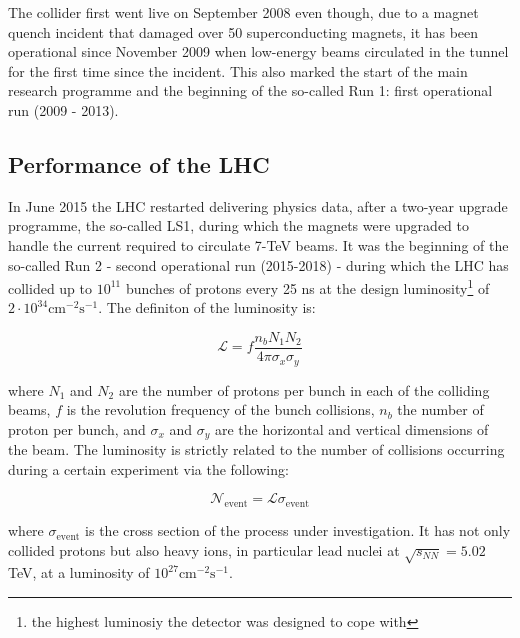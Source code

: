 		The collider first went live on September 2008 even though, due to a magnet quench incident that damaged over 50 superconducting magnets, it has been operational since November 2009 when low-energy beams circulated in the tunnel for the first time since the incident. This also marked the start of the main research programme and the beginning of the so-called Run 1: first operational run (2009 - 2013).


		\subsection*{Performance of the LHC}

			In June 2015 the \ac{LHC} restarted delivering physics data, after a two-year upgrade programme, the so-called \ac{LS1}, during which the magnets were upgraded to handle the current required to circulate 7-TeV beams. It was the beginning of the so-called Run 2 - second operational run (2015-2018) - during which the \ac{LHC} has collided up to $10^{11}$ bunches of protons every 25 ns at the design luminosity\footnote{the highest luminosiy the detector was designed to cope with} of $2 \cdot 10^{34} \mathrm{cm}^{-2}\mathrm{s}^{-1}$. The definiton of the luminosity is:

			\begin{equation}
				{\mathcal L} = f \frac{n_b N_1 N_2}{4 \pi \sigma_x \sigma_y}
			\label{eq:lumi}
			\end{equation}

			\noindent where $N_1$ and $N_2$ are the number of protons per bunch in each of the colliding beams, $f$ is the revolution frequency of the bunch collisions, $n_b$ the number of proton per bunch, and $\sigma_x$ and $\sigma_y$ are the horizontal and vertical dimensions of the beam. The luminosity is strictly related to the number of collisions occurring during a certain experiment via the following: 

			\begin{equation}
					{\mathcal N}_{\mathrm{event}} = {\mathcal L} \sigma_{\mathrm{event}}
			\label{eq:lumiEvt}
			\end{equation}

			\noindent where $\sigma_{\mathrm{event}}$ is the cross section of the process under investigation.  It has not only collided protons but also heavy ions, in particular lead nuclei at $\sqrt{s_{NN}} = 5.02$ TeV, at a luminosity of $10^{27} \mathrm{cm}^{-2} \mathrm{s}^{-1}$\cite{HI2015}.



